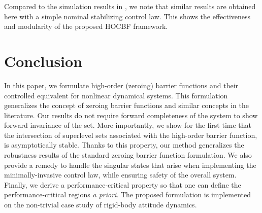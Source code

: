 \documentclass[letterpaper, 10 pt, journal, twoside]{IEEEtran}
\theoremstyle{plain}
\begin{document}
Compared to the simulation results in \cite{tan2020construction}, we note that similar results are obtained here with a simple nominal stabilizing control law. This shows the effectiveness and modularity of the proposed HOCBF framework. 


\section{Conclusion}


In this paper, we formulate high-order (zeroing) barrier functions {and their controlled equivalent} for nonlinear dynamical {systems}. This formulation generalizes the concept of zeroing barrier functions and similar concepts in the literature. {Our results do not require}  forward completeness of the system to show forward invariance {of the set}. More importantly, we show for the first time that the {intersection of superlevel sets} associated with the high-order barrier function, is asymptotically stable. Thanks to this property, our method generalizes the robustness results of the standard zeroing barrier function formulation. We also provide a remedy to handle the singular states that arise when implementing the minimally-invasive control law, while ensuring safety of the overall system. Finally, we derive a performance-critical property so that one can define the performance-critical regions \textit{a priori}. The proposed formulation is implemented on the non-trivial case study of rigid-body attitude dynamics.




\end{document}
